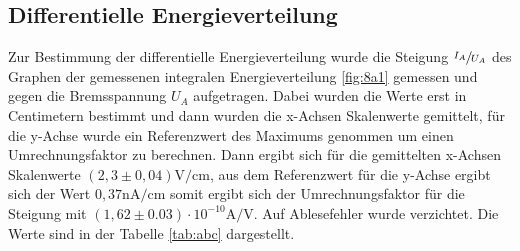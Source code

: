 \subsection{Differentielle Energieverteilung}
Zur Bestimmung der differentielle Energieverteilung wurde die Steigung $\sfrac{I_A}{U_A} $
des Graphen
der gemessenen integralen Energieverteilung \ref{fig:8a1} gemessen und gegen die Bremsspannung $U_A$
aufgetragen. Dabei wurden die Werte erst in Centimetern bestimmt und dann wurden
die x-Achsen Skalenwerte gemittelt, für die y-Achse wurde ein Referenzwert des Maximums
genommen um einen Umrechnungsfaktor zu berechnen. Dann ergibt sich für die gemittelten
x-Achsen Skalenwerte $  (2,3 \pm 0,04)\si{\volt \per \centi \meter} $,
aus dem Referenzwert für die y-Achse ergibt sich der Wert $ 0,37 \si{\nano \ampere\per\centi \meter}$
somit ergibt sich der Umrechnungsfaktor für die Steigung mit $(1,62 \pm 0.03)\cdot 10^{-10}
\si{\ampere \per \volt} $. Auf Ablesefehler wurde verzichtet. Die Werte sind in der
Tabelle \ref{tab:abc} dargestellt.
